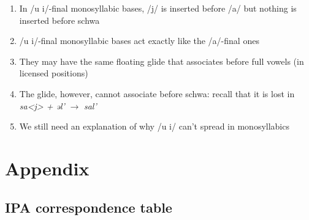 \documentclass[a4paper, 12pt]{article}
\begin{document}
	\begin{enumerate}[$\gg$]
		\item In /u i/-final monosyllabic bases, /j/ is inserted before /a/ but nothing is inserted before schwa
		\item /u i/-final monosyllabic bases act exactly like the /a/-final ones
		\item They may have the same floating glide that associates before full vowels (in licensed positions)
		\item The glide, however, cannot associate before schwa: recall that it is lost in \emph{sa<j> + əl'} $\rightarrow$ \emph{sal'}
		\item We still need an explanation of why /u i/ can't spread in monosyllabics
	\end{enumerate}
			
		\section*{Appendix}
		
			\subsection*{IPA correspondence table \vspace*{-1em}}
			
\end{document}
